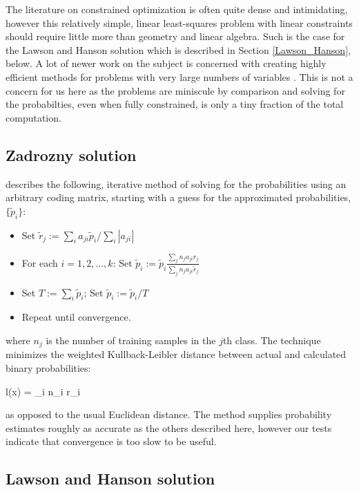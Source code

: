 The literature on constrained optimization is often quite dense and 
intimidating, however this relatively simple, linear least-squares problem with 
linear constraints should require little more than geometry and linear algebra.
Such is the case for the Lawson and Hanson solution which is described
in Section \ref{Lawson_Hanson}, below.
A lot of newer work on the subject is concerned with creating highly
efficient methods
for problems with very large numbers of variables \citep{Mueller_etal2001}.
This is not a concern for us here as the problems are miniscule by comparison
and solving for the probabilties, even when fully constrained, is only a
tiny fraction of the total computation.


\subsection{Zadrozny solution}

\label{Zadrozny}

\citet{Zadrozny2001} describes the following, iterative method of solving
for the probabilities using an arbitrary coding matrix, starting with a 
guess for the approximated probabilities, $\lbrace \tilde p_i \rbrace$:

\begin{itemize}
	\item Set $\tilde r_j := \sum_i a_{ji} \tilde p_i/\sum_i |a_{ji}|$
	\item For each $i=1, 2, ..., k$:
			Set $\tilde p_i := \tilde p_i \frac{\sum_j n_j a_{ji} r_j}{\sum_j n_j a_{ji} \tilde r_j}$
	\item Set $T := \sum_i \tilde p_i$; Set $\tilde p_i := \tilde p_i/T$
	\item Repeat until convergence.
\end{itemize}
where $n_j$ is the number of training samples in the $j$th class.
The technique minimizes the weighted Kullback-Leibler distance between actual and calculated
binary probabilities:
\begin{eqnnon}
	l(\vec x) = \sum_{i} n_i r_i 
\end{eqnnon}
as opposed to the usual Euclidean distance.
The method supplies probability estimates roughly as accurate as the others described here,
however our tests indicate that convergence is too slow to be useful.

\subsection{Lawson and Hanson solution}

